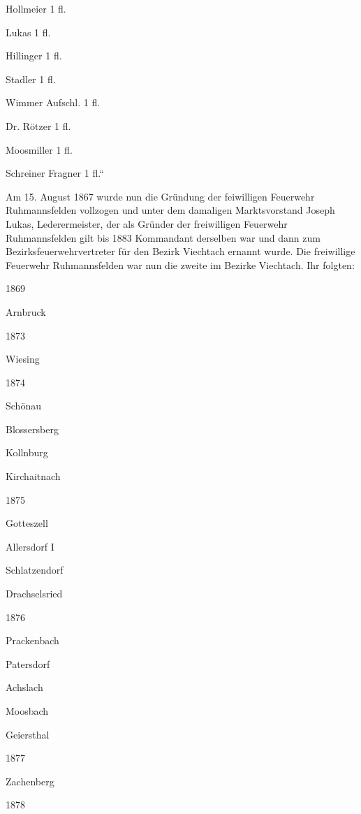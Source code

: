 \documentclass{book}
\begin{document}
Hollmeier 1 fl.

Lukas 1 fl.



Hillinger 1 fl.

Stadler 1 fl.

Wimmer Aufschl. 1 fl.

Dr. Rötzer 1 fl.

Moosmiller 1 fl.

Schreiner Fragner 1 fl.“



Am 15. August 1867 wurde nun die Gründung der feiwilligen Feuerwehr
Ruhmannsfelden vollzogen und unter dem damaligen Marktsvorstand Joseph Lukas,
Lederermeister, der als Gründer der freiwilligen Feuerwehr Ruhmannsfelden gilt
bis 1883 Kommandant derselben war und dann zum Bezirksfeuerwehrvertreter für den
Bezirk Viechtach ernannt wurde. Die freiwillige Feuerwehr Ruhmannsfelden war nun
die zweite im Bezirke Viechtach. Ihr folgten:



1869

Arnbruck

1873

Wiesing

1874

Schönau



Blossersberg



Kollnburg



Kirchaitnach

1875

Gotteszell



Allersdorf I



Schlatzendorf



Drachselsried

1876

Prackenbach



Patersdorf



Achslach



Moosbach



Geiersthal

1877

Zachenberg

1878
\end{document}
